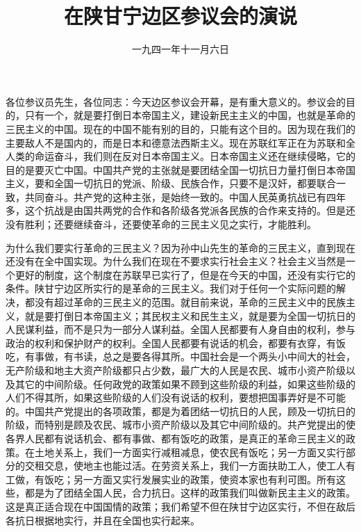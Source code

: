 
\title{在陕甘宁边区参议会的演说}
\date{一九四一年十一月六日}
\maketitle


各位参议员先生，各位同志：今天边区参议会开幕，是有重大意义的。参议会的目的，只有一个，就是要打倒日本帝国主义，建设新民主主义的中国，也就是革命的三民主义的中国。现在的中国不能有别的目的，只能有这个目的。因为现在我们的主要敌人不是国内的，而是日本和德意法西斯主义。现在苏联红军正在为苏联和全人类的命运奋斗，我们则在反对日本帝国主义。日本帝国主义还在继续侵略，它的目的是要灭亡中国。中国共产党的主张就是要团结全国一切抗日力量打倒日本帝国主义，要和全国一切抗日的党派、阶级、民族合作，只要不是汉奸，都要联合一致，共同奋斗。共产党的这种主张，是始终一致的。中国人民英勇抗战已有四年多，这个抗战是由国共两党的合作和各阶级各党派各民族的合作来支持的。但是还没有胜利；还要继续奋斗，还要使革命的三民主义见之实行，才能胜利。

为什么我们要实行革命的三民主义？因为孙中山先生的革命的三民主义，直到现在还没有在全中国实现。为什么我们在现在不要求实行社会主义？社会主义当然是一个更好的制度，这个制度在苏联早已实行了，但是在今天的中国，还没有实行它的条件。陕甘宁边区所实行的是革命的三民主义。我们对于任何一个实际问题的解决，都没有超过革命的三民主义的范围。就目前来说，革命的三民主义中的民族主义，就是要打倒日本帝国主义；其民权主义和民生主义，就是要为全国一切抗日的人民谋利益，而不是只为一部分人谋利益。全国人民都要有人身自由的权利，参与政治的权利和保护财产的权利。全国人民都要有说话的机会，都要有衣穿，有饭吃，有事做，有书读，总之是要各得其所。中国社会是一个两头小中间大的社会，无产阶级和地主大资产阶级都只占少数，最广大的人民是农民、城市小资产阶级以及其它的中间阶级。任何政党的政策如果不顾到这些阶级的利益，如果这些阶级的人们不得其所，如果这些阶级的人们没有说话的权利，要想把国事弄好是不可能的。中国共产党提出的各项政策，都是为着团结一切抗日的人民，顾及一切抗日的阶级，而特别是顾及农民、城市小资产阶级以及其它中间阶级的。共产党提出的使各界人民都有说话机会、都有事做、都有饭吃的政策，是真正的革命三民主义的政策。在土地关系上，我们一方面实行减租减息，使农民有饭吃；另一方面又实行部分的交租交息，使地主也能过活。在劳资关系上，我们一方面扶助工人，使工人有工做，有饭吃；另一方面又实行发展实业的政策，使资本家也有利可图。所有这些，都是为了团结全国人民，合力抗日。这样的政策我们叫做新民主主义的政策。这是真正适合现在中国国情的政策；我们希望不但在陕甘宁边区实行，不但在敌后各抗日根据地实行，并且在全国也实行起来。

